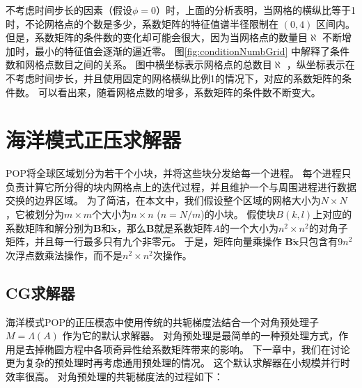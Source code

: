 不考虑时间步长的因素（假设$\phi=0$）时，上面的分析表明，当网格的横纵比等于1时，不论网格点的个数是多少，系数矩阵的特征值谱半径限制在 $(0,4)$ 区间内。
但是，系数矩阵的条件数的变化却可能会很大，因为当网格点的数量目$\aleph$ 不断增加时，最小的特征值会逐渐的逼近零。 
图\ref{fig:conditionNumbGrid} 中解释了条件数和网格点数目之间的关系。 
图中横坐标表示网格点的总数目$\aleph$ ，纵坐标表示在不考虑时间步长，并且使用固定的网格横纵比例1的情况下，对应的系数矩阵的条件数。
可以看出来，随着网格点数的增多，系数矩阵的条件数不断变大。



\section{海洋模式正压求解器}
\label{solver:bottleneck}

POP将全球区域划分为若干个小块，并将这些块分发给每一个进程。
每个进程只负责计算它所分得的块内网格点上的迭代过程，并且维护一个与周围进程进行数据交换的边界区域。 
为了简洁，在本文中，我们假设整个区域的网格大小为$N\times N$，它被划分为$m\times m$个大小为$n\times n$ ($n=N/m$)的小块。 
假使块$B(k,l)$上对应的系数矩阵和解分别为$\textbf{B}$和$\tilde{\textbf{x}}$，那么$\textbf{B}$就是系数矩阵$A$的一个大小为$n^2\times n^2$的对角子矩阵，并且每一行最多只有九个非零元\cite{hu2013scalable}。 
于是，矩阵向量乘操作 $\textbf{B}\tilde{\textbf{x}}$只包含有$9n^2$次浮点数乘法操作，而不是$n^2\times n^2$次操作。 
 
\subsection{CG求解器} 
\label{solver:pcg}
 
海洋模式POP的正压模态中使用传统的共轭梯度法结合一个对角预处理子$M = \Lambda(A)$ 作为它的默认求解器。 
对角预处理是最简单的一种预处理方式，作用是去掉椭圆方程中各项奇异性给系数矩阵带来的影响。
下一章中，我们在讨论更为复杂的预处理时再考虑通用预处理的情况。
这个默认求解器在小规模并行时效率很高。 
对角预处理的共轭梯度法的过程如下： 

